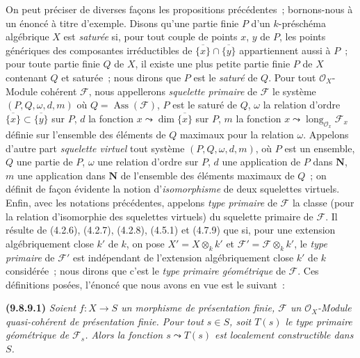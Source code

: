 \begin{remark}[9.8.9]
\label{IV.9.8.9-fr}
On peut préciser de diverses façons les propositions précédentes~;
bornons-nous à un énoncé à titre d'exemple. Disons qu'une partie finie $P$ d'un
$k$-préschéma algébrique $X$ est \emph{saturée} si, pour tout couple de points
$x$, $y$ de $P$, les points génériques des composantes irréductibles de
$\overline{\{x\}}\cap\overline{\{y\}}$ appartiennent aussi à $P$~; pour toute
partie finie $Q$ de $X$, il existe une plus petite partie finie $P$ de $X$
contenant $Q$ et saturée~; nous dirons que $P$ est le \emph{saturé} de $Q$. Pour
tout $\mathcal O_X$-Module cohérent $\mathcal F$, nous appellerons
\emph{squelette primaire} de $\mathcal F$ le système $(P,Q,\omega,d,m)$ où
$Q=\operatorname{Ass}(\mathcal F)$, $P$ est le saturé de $Q$, $\omega$ la
relation d'ordre $\overline{\{x\}}\subset\overline{\{y\}}$ sur $P$, $d$ la
fonction $x\leadsto\dim\overline{\{x\}}$ sur $P$, $m$ la fonction
$x\leadsto\operatorname{long}_{\mathcal O_x}\mathcal F_x$ définie sur l'ensemble
des éléments de $Q$ maximaux pour la relation $\omega$. Appelons d'autre part
\emph{squelette virtuel} tout système $(P,Q,\omega,d,m)$, où $P$ est un
ensemble, $Q$ une partie de $P$, $\omega$ une relation d'ordre sur $P$, $d$ une
application de $P$ dans $\mathbf N$, $m$ une application dans $\mathbf N$ de
l'ensemble des éléments maximaux de $Q$~; on définit de façon évidente la notion
d'\emph{isomorphisme} de deux squelettes virtuels. Enfin, avec les notations
précédentes, appelons \emph{type primaire} de $\mathcal F$ la classe (pour la
relation d'isomorphie des squelettes virtuels) du squelette primaire de
$\mathcal F$. Il résulte de (4.2.6), (4.2.7), (4.2.8), (4.5.1) et (4.7.9) que
si, pour une extension algébriquement close $k'$ de $k$, on pose
$X'=X\otimes_k k'$ et $\mathcal F'=\mathcal F\otimes_k k'$, le
\emph{type primaire} de $\mathcal F'$ est indépendant de
l'extension algébriquement close $k'$ de $k$ considérée~; nous dirons que c'est
le \emph{type primaire géométrique} de $\mathcal F$. Ces définitions posées,
l'énoncé que nous avons en vue est le suivant~:

\label{IV.9.8.9.1-fr}%
\textbf{(9.8.9.1)} \textit{Soient $f:X\to S$ un morphisme de présentation finie,
$\mathcal F$ un $\mathcal O_X$-Module quasi-cohérent de présentation finie.
Pour tout $s\in S$, soit $T(s)$ le type primaire géométrique de $\mathcal F_s$.
Alors la fonction $s\leadsto T(s)$ est localement constructible dans $S$.}


\end{remark}
